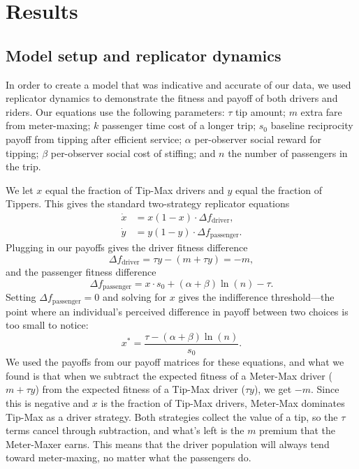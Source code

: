 \documentclass[pdflatex,sn-mathphys-num]{sn-jnl}%
\theoremstyle{thmstyleone}%
\theoremstyle{thmstyletwo}%
\theoremstyle{thmstylethree}%
\begin{document}
\section{Results}\label{sec:results}

\subsection{Model setup and replicator dynamics}\label{sec:model}
In order to create a model that was indicative and accurate of our data, we used replicator dynamics to demonstrate the fitness and payoff of both drivers and riders. Our equations use the following parameters: $\tau$ tip amount; $m$ extra fare from meter-maxing; $k$ passenger time cost of a longer trip; $s_0$ baseline reciprocity payoff from tipping after efficient service; $\alpha$ per-observer social reward for tipping; $\beta$ per-observer social cost of stiffing; and $n$ the number of passengers in the trip.

We let $x$ equal the fraction of Tip-Max drivers and $y$ equal the fraction of Tippers. This gives the standard two-strategy replicator equations~\cite{hofbauer1998}
\begin{align}
\dot{x} &= x(1-x) \cdot \Delta f_{\mathrm{driver}}, \label{eq:rep1} \\
\dot{y} &= y(1-y) \cdot \Delta f_{\mathrm{passenger}}. \label{eq:rep2}
\end{align}
Plugging in our payoffs gives the driver fitness difference
\begin{equation}
\Delta f_{\mathrm{driver}} = \tau y - (m + \tau y) = -m, \label{eq:dfdriver}
\end{equation}
and the passenger fitness difference
\begin{equation}
\Delta f_{\mathrm{passenger}} = x \cdot s_0 + (\alpha+\beta)\ln(n) - \tau. \label{eq:dfpassenger}
\end{equation}
Setting $\Delta f_{\mathrm{passenger}} = 0$ and solving for $x$ gives the indifference threshold---the point where an individual's perceived difference in payoff between two choices is too small to notice:
\begin{equation}
x^* = \frac{\tau - (\alpha+\beta)\ln(n)}{s_0}. \label{eq:xstar}
\end{equation}
We used the payoffs from our payoff matrices for these equations, and what we found is that when we subtract the expected fitness of a Meter-Max driver ($m + \tau y$) from the expected fitness of a Tip-Max driver ($\tau y$), we get $-m$. Since this is negative and $x$ is the fraction of Tip-Max drivers, Meter-Max dominates Tip-Max as a driver strategy. Both strategies collect the value of a tip, so the $\tau$ terms cancel through subtraction, and what's left is the $m$ premium that the Meter-Maxer earns. This means that the driver population will always tend toward meter-maxing, no matter what the passengers do.
\end{document}
